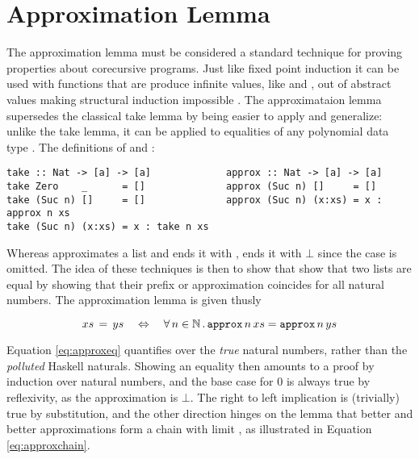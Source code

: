 \section{Approximation Lemma}

The approximation lemma must be considered a standard technique for
proving properties about corecursive programs. Just like fixed point
induction it can be used with functions that are produce infinite
values, like  and , out of abstract values
making structural induction impossible \cite{corecursive}.  The
approximataion lemma supersedes the classical take lemma
\cite{introfp} by being easier to apply and generalize: unlike the
take lemma, it can be applied to equalities of any polynomial
data type \cite{genapprox}. The definitions of  and
: %



\begin{verbatim}
take :: Nat -> [a] -> [a]             approx :: Nat -> [a] -> [a]
take Zero    _      = []              approx (Suc n) []     = []
take (Suc n) []     = []              approx (Suc n) (x:xs) = x : approx n xs
take (Suc n) (x:xs) = x : take n xs
\end{verbatim}

Whereas  approximates a list and ends it with \hs{[]},
 ends it with $\bot$ since the  case is
omitted. The idea of these techniques is then to show that show that
two lists are equal by showing that their prefix or approximation
coincides for all natural numbers. The approximation lemma is given thusly

\begin{equation}
\label{eq:approxeq}
xs \, = \, ys \quad \Leftrightarrow \quad \fa{n \in \mathbb{N}} \hs{approx} \, n \, xs = \hs{approx} \, n \, ys
\end{equation}

Equation \ref{eq:approxeq} quantifies over the \emph{true} natural
numbers, rather than the \emph{polluted} Haskell naturals. Showing an
equality then amounts to a proof by induction over natural numbers,
and the base case for $0$ is always true by reflexivity, as the
approximation is $\bot$.
The right to left implication is (trivially) true by substitution, and
the other direction hinges on the lemma that better and better
approximations form a chain with limit , as illustrated in
Equation \ref{eq:approxchain}.

